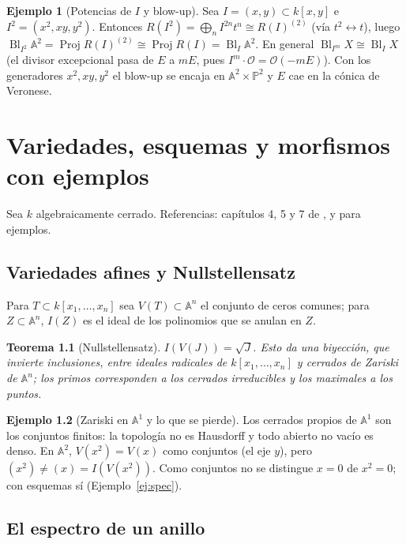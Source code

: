 \documentclass[11pt,a4paper,oneside]{book}
\newcommand{\Proj}{\operatorname{Proj}}
\newcommand{\Bl}{\operatorname{Bl}}
\newcommand{\A}{\mathbb{A}}
\newcommand{\PP}{\mathbb{P}}
\newcommand{\cO}{\mathcal{O}}
\theoremstyle{plain}
\newtheorem{teorema}{Teorema}[chapter]
\theoremstyle{definition}
\newtheorem{ejemplo}[teorema]{Ejemplo}
\theoremstyle{remark}
\begin{document}
\begin{ejemplo}[Potencias de $I$ y blow-up]\label{ej:potencias}
Sea $I=(x,y)\subset k[x,y]$ e $I^2=(x^2,xy,y^2)$. Entonces $R(I^2)=\bigoplus_nI^{2n}t^n\cong R(I)^{(2)}$ (vía $t^2\leftrightarrow t$), luego $\Bl_{I^2}\A^2=\Proj R(I)^{(2)}\cong\Proj R(I)=\Bl_I\A^2$. En general $\Bl_{I^m}X\cong\Bl_IX$ (el divisor excepcional pasa de $E$ a $mE$, pues $I^m\cdot\cO=\cO(-mE)$). Con los generadores $x^2,xy,y^2$ el blow-up se encaja en $\A^2\times\PP^2$ y $E$ cae en la cónica de Veronese.
\end{ejemplo}

\chapter{Variedades, esquemas y morfismos con ejemplos}\label{ap:esquemas}

Sea $k$ algebraicamente cerrado. Referencias: capítulos 4, 5 y 7 de \cite{Pal}, y \cite{EH} para ejemplos.

\section{Variedades afines y Nullstellensatz}

Para $T\subset k[x_1,\dots,x_n]$ sea $V(T)\subset\A^n$ el conjunto de ceros comunes; para $Z\subset\A^n$, $I(Z)$ es el ideal de los polinomios que se anulan en $Z$.

\begin{teorema}[Nullstellensatz]
$I(V(J))=\sqrt J$. Esto da una biyección, que invierte inclusiones, entre ideales radicales de $k[x_1,\dots,x_n]$ y cerrados de Zariski de $\A^n$; los primos corresponden a los cerrados irreducibles y los maximales a los puntos.
\end{teorema}

\begin{ejemplo}[Zariski en $\A^1$ y lo que se pierde]\label{ej:zariski}
Los cerrados propios de $\A^1$ son los conjuntos finitos: la topología no es Hausdorff y todo abierto no vacío es denso. En $\A^2$, $V(x^2)=V(x)$ como conjuntos (el eje $y$), pero $(x^2)\ne(x)=I(V(x^2))$. Como conjuntos no se distingue $x=0$ de $x^2=0$; con esquemas sí (Ejemplo~\ref{ej:spec}).
\end{ejemplo}

\section{El espectro de un anillo}
\end{document}
